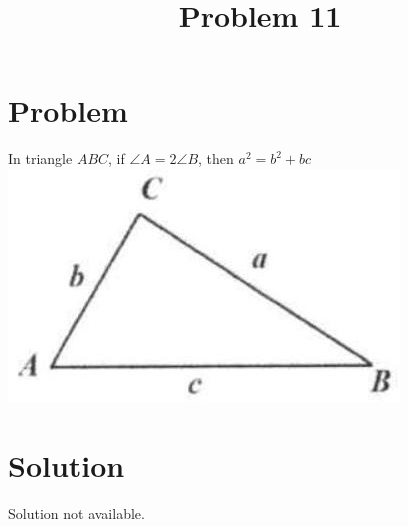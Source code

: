 \documentclass{article}
\title{Problem 11}
\date{}
\begin{document}
\maketitle

\section*{Problem}
In triangle \(A B C\), if \(\angle A=2 \angle B\), then \(a^{2}=b^{2}+b c\)\\
\centering
\includegraphics[width=\textwidth]{images/066(1).jpg}

\section*{Solution}
Solution not available.
\end{document}

